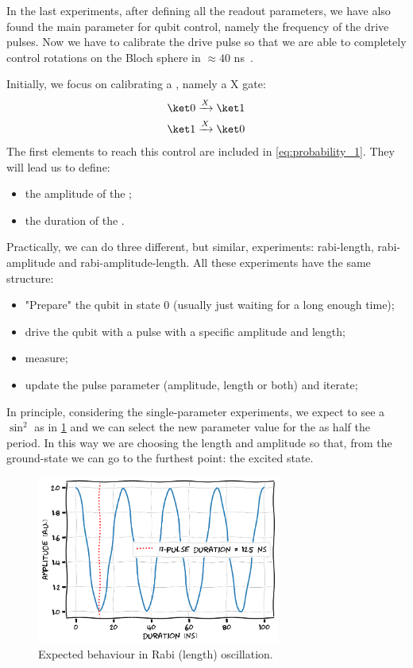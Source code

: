 
In the last experiments, after defining all the readout parameters, we have also found the main parameter for qubit control, namely the frequency of the drive pulses.
Now we have to calibrate the drive pulse so that we are able to completely control rotations on the Bloch sphere in $\approx40$ ns~\cite{Rabi1936, Wallraff2005}.

Initially, we focus on calibrating a \pipulse, namely a X gate:
\begin{align*}
    \ket 0 &\xrightarrow{X} \ket 1 \\
    \ket 1 &\xrightarrow{X} \ket 0 \\
\end{align*}
The first elements to reach this control are included in \cref{eq:probability_1}. They will lead us to define:
\begin{itemize}
    \item the amplitude of the \pipulse;
    \item the duration of the \pipulse.
\end{itemize}

Practically, we can do three different, but similar, experiments: rabi-length, rabi-amplitude and rabi-amplitude-length. All these experiments have the same structure:
\begin{itemize}
    \item "Prepare" the qubit in state 0 (usually just waiting for a long enough time);
    \item drive the qubit with a pulse with a specific amplitude and length;
    \item measure;
    \item update the pulse parameter (amplitude, length or both) and iterate;
\end{itemize}

In principle, considering the single-parameter experiments, we expect to see a $\sin^2$ as in \cref{fig:sketch_rabi} and we can select the new parameter value for the \pipulse as half the period.
In this way we are choosing the length and amplitude so that, from the ground-state we can go to the furthest point: the excited state.

\begin{figure}[ht]
    \centering
    \includegraphics[width=8cm]{characterization/figures/rabi_sketch.pdf}
    \caption{Expected behaviour in Rabi (length) oscillation.}
    \label{fig:sketch_rabi}
\end{figure}

